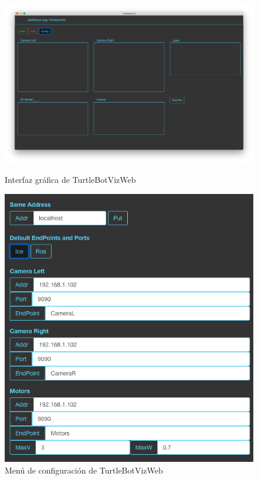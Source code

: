 \begin{figure}[htb]
\centering
  \begin{minipage}{0.45\textwidth}
    \centering
    \includegraphics[width=1\textwidth]{figures/interfazTurtleBotviz.png}
    \caption{Interfaz gráfica de TurtleBotVizWeb}
    \label{fig.iterfazTurtleBotviz}
  \end{minipage}%
  \hspace{5mm}
  \begin{minipage}{0.45\textwidth}
    \centering
    \includegraphics[width=1\textwidth]{figures/configTurtleBot.png}
    \caption{Menú de configuración de TurtleBotVizWeb}
    \label{fig.configTurtleBot}
  \end{minipage}
\end{figure}

